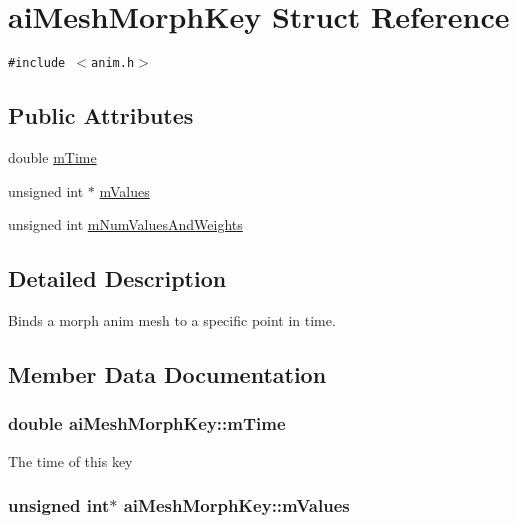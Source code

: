\hypertarget{structai_mesh_morph_key}{
\section{aiMeshMorphKey Struct Reference}
\label{structai_mesh_morph_key}
}
{\tt \#include $<$anim.h$>$}

\subsection*{Public Attributes}
\begin{CompactItemize}
\item 
double \hyperlink{structai_mesh_morph_key_1429195df415bf1288002b45bba30994}{mTime}
\item 
unsigned int $\ast$ \hyperlink{structai_mesh_morph_key_33bdd586aca85e5bb27162203f780dc3}{mValues}
\item 
unsigned int \hyperlink{structai_mesh_morph_key_28190ef15ed3535c9ae8dc1c8738a6ed}{mNumValuesAndWeights}
\end{CompactItemize}


\subsection{Detailed Description}
Binds a morph anim mesh to a specific point in time. 

\subsection{Member Data Documentation}
\hypertarget{structai_mesh_morph_key_1429195df415bf1288002b45bba30994}{
\subsubsection[mTime]{\setlength{\rightskip}{0pt plus 5cm}double {\bf aiMeshMorphKey::mTime}}}
\label{structai_mesh_morph_key_1429195df415bf1288002b45bba30994}


The time of this key \hypertarget{structai_mesh_morph_key_33bdd586aca85e5bb27162203f780dc3}{
\subsubsection[mValues]{\setlength{\rightskip}{0pt plus 5cm}unsigned int$\ast$ {\bf aiMeshMorphKey::mValues}}}
\label{structai_mesh_morph_key_33bdd586aca85e5bb27162203f780dc3}


